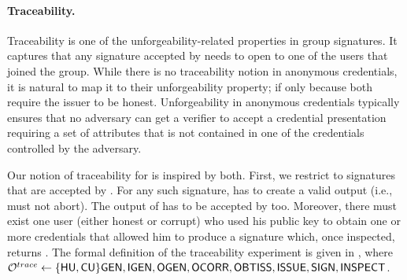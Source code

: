 \paragraph{Traceability.} %
Traceability is one of the unforgeability-related properties in group
signatures. It captures that any signature accepted by \Verify needs to open
to one of the users that joined the group. While there is no traceability notion
in anonymous credentials, it is natural to map it to their unforgeability
property; if only because both require the issuer to be honest. Unforgeability
in anonymous credentials typically ensures that no adversary can get a verifier
to accept a credential presentation requiring a set of attributes that is not
contained in one of the credentials controlled by the adversary.

Our notion of traceability for \UAS is inspired by both. First, we restrict to
signatures that are accepted by \Verify. For any such signature, \Inspect has to
create a valid output (i.e., must not abort). The output of \Inspect has to be
accepted by \Judge too. Moreover, there must exist one user (either honest or
corrupt) who used his public key to obtain one or more credentials that allowed
him to produce a signature which, once inspected, returns \y. The formal
definition of the traceability experiment is given in ,
where $\mathcal{O}^{trace} \gets \lbrace\mathsf{HU},\mathsf{CU}\rbrace\mathsf{GEN},\mathsf{IGEN},\mathsf{OGEN},\mathsf{OCORR},\mathsf{OBTISS},
\mathsf{ISSUE},\mathsf{SIGN},\mathsf{INSPECT}$.

